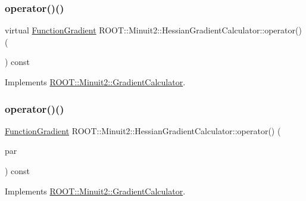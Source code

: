 \subsubsection{\texorpdfstring{operator()()}{operator()()}\hspace{0.1cm}{\footnotesize\ttfamily [2/6]}}
{\footnotesize\ttfamily virtual \mbox{\hyperlink{classROOT_1_1Minuit2_1_1FunctionGradient}{Function\+Gradient}} R\+O\+O\+T\+::\+Minuit2\+::\+Hessian\+Gradient\+Calculator\+::operator() (\begin{DoxyParamCaption}\item[{const \mbox{\hyperlink{classROOT_1_1Minuit2_1_1MinimumParameters}{Minimum\+Parameters}} \&}]{ }\end{DoxyParamCaption}) const\hspace{0.3cm}{\ttfamily [virtual]}}



Implements \mbox{\hyperlink{classROOT_1_1Minuit2_1_1GradientCalculator_a1bae913e96ffc9ece28664a5f6f79cb0}{R\+O\+O\+T\+::\+Minuit2\+::\+Gradient\+Calculator}}.

\mbox{\label{classROOT_1_1Minuit2_1_1HessianGradientCalculator_ada968380aae7c1c6b6d0716d6a9804b5}} 
\subsubsection{\texorpdfstring{operator()()}{operator()()}\hspace{0.1cm}{\footnotesize\ttfamily [3/6]}}
{\footnotesize\ttfamily \mbox{\hyperlink{classROOT_1_1Minuit2_1_1FunctionGradient}{Function\+Gradient}} R\+O\+O\+T\+::\+Minuit2\+::\+Hessian\+Gradient\+Calculator\+::operator() (\begin{DoxyParamCaption}\item[{const \mbox{\hyperlink{classROOT_1_1Minuit2_1_1MinimumParameters}{Minimum\+Parameters}} \&}]{par }\end{DoxyParamCaption}) const\hspace{0.3cm}{\ttfamily [virtual]}}



Implements \mbox{\hyperlink{classROOT_1_1Minuit2_1_1GradientCalculator_a1bae913e96ffc9ece28664a5f6f79cb0}{R\+O\+O\+T\+::\+Minuit2\+::\+Gradient\+Calculator}}.

